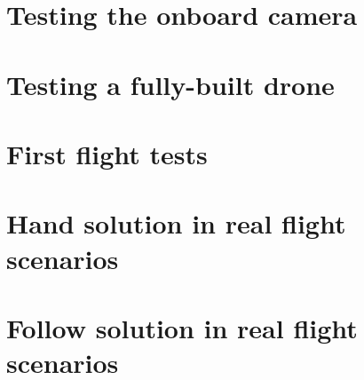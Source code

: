 
\section{Testing the onboard camera}


\section{Testing a fully-built drone}


\section{First flight tests}


\section{Hand solution in real flight scenarios}


\section{Follow solution in real flight scenarios}

            

\cleardoublepage